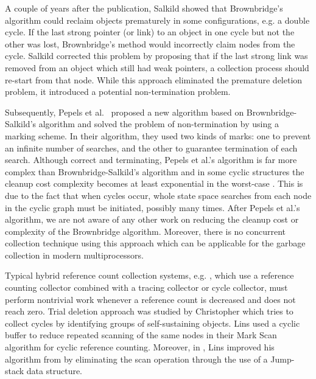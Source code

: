 A couple of years after the publication, Salkild \cite{Salkild1987} showed that Brownbridge's algorithm
\cite{Brownbridge1985} could reclaim objects prematurely in some
configurations, e.g. a double cycle. If the last strong pointer (or link) to
an object in one cycle but not the other was lost, Brownbridge's
method would incorrectly claim nodes from the cycle.
Salkild \cite{Salkild1987} corrected this problem by proposing
that if the last strong link was removed from an object which still
had weak pointers, a collection process should re-start from that node.
While this approach eliminated the premature deletion problem, it introduced a
potential non-termination problem.

Subsequently, Pepels et al.~\cite{Pepels1988} proposed a new algorithm based on
Brownbridge-Salkild's algorithm and solved the problem of non-termination by
using a marking scheme. In their algorithm, they used two kinds of marks: one to
prevent an infinite number of searches, and the other to guarantee termination
of each search. Although correct and terminating, Pepels et al.'s algorithm is far more
complex than Brownbridge-Salkild's algorithm and in some cyclic structures the
cleanup cost complexity becomes at least
exponential in the worst-case \cite{Jones1996}. This is due to the fact that when
cycles occur, whole state space searches from
each node in the cyclic graph must be initiated, possibly many times. After Pepels et al.'s algorithm, we are not aware
of any other work on reducing the cleanup cost or complexity of the Brownbridge
algorithm. Moreover, there is no concurrent collection technique using this approach which can be applicable for the garbage collection in modern multiprocessors.

Typical hybrid reference count collection systems, e.g. \cite{Bacon2001,Levanoni2006,Bacon:2001:JWC,Barabash2005,Lins2008}, which use a reference counting collector combined with a tracing collector or cycle collector,
must perform nontrivial work whenever a reference count is decreased and does
not reach zero. Trial deletion approach was studied by Christopher \cite{Christopher1984} which tries to collect cycles by identifying groups of self-sustaining objects. 
Lins \cite{Lins:1992:CRC} used a cyclic buffer to reduce repeated scanning of the same nodes in their Mark Scan algorithm for cyclic reference counting. Moreover, in \cite{Lins:2002:EAC}, Lins improved his algorithm  from \cite{Lins:1992:CRC} by eliminating the scan operation through the use of a Jump-stack data structure.

